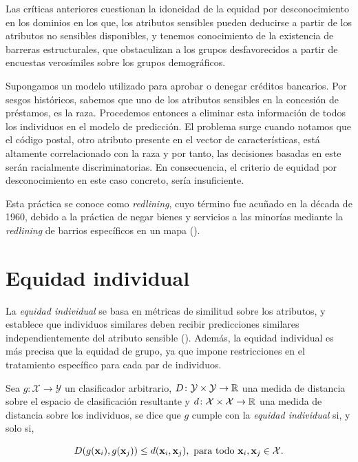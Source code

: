 \documentclass[oneside,openright,titlepage,numbers=noenddot,openany,headinclude,footinclude=true,
cleardoublepage=empty,abstractoff,BCOR=5mm,paper=a4,fontsize=12pt,main=spanish]{scrreprt}
\begin{document}
Las críticas anteriores cuestionan la idoneidad de la
equidad por desconocimiento en los dominios en los que, los atributos sensibles pueden deducirse a partir de los atributos no sensibles disponibles, y tenemos conocimiento de la existencia de barreras estructurales, que obstaculizan a los grupos desfavorecidos a partir de encuestas verosímiles sobre los grupos demográficos.

\begin{example} \label{ex:redlining}
Supongamos un modelo utilizado para aprobar o denegar créditos bancarios. Por sesgos históricos, sabemos que uno de los atributos sensibles en la concesión de préstamos, es la raza. Procedemos entonces a eliminar esta información de todos los individuos en el modelo de predicción. El problema surge cuando notamos que el código postal, otro atributo presente en el vector de características, está altamente correlacionado con la raza y por tanto, las decisiones basadas en este serán racialmente discriminatorias. En consecuencia, el criterio de equidad por desconocimiento en este caso concreto, sería insuficiente. 

Esta práctica se conoce como \textit{redlining}, cuyo término fue acuñado en la década de 1960, debido a la práctica de negar bienes y servicios a las minorías mediante la \textit{redlining} de barrios específicos en un mapa (\cite{redlining2012}).
\end{example}


\section{Equidad individual}

La \textit{equidad individual} se basa en métricas de similitud sobre los atributos, y  establece que individuos similares deben recibir predicciones similares independientemente del atributo sensible (\cite{detect2012}). Además, la equidad individual es más precisa que la equidad de grupo, ya que impone restricciones en el tratamiento específico para cada par de individuos.\\ 

\begin{definition} \label{def:indvfair}
Sea $g\colon \mathcal{X} \to \mathcal{Y}$ un clasificador arbitrario, $D\colon \mathcal{Y} \times \mathcal{Y} \to \mathbb{R}$ una medida de distancia sobre el espacio de clasificación resultante y $d\colon \mathcal{X} \times \mathcal{X} \to \mathbb{R}$ una medida de distancia sobre los individuos, se dice que $g$ cumple con la \textit{equidad individual} si, y solo si,

\begin{equation*} 
D(g(\textbf{x}_i),g(\textbf{x}_j))\leq d(\textbf{x}_i,\textbf{x}_j), \ \text{para todo} \ \textbf{x}_i,\textbf{x}_j \in \mathcal{X}.
\end{equation*}
\end{definition}\
\end{document}

